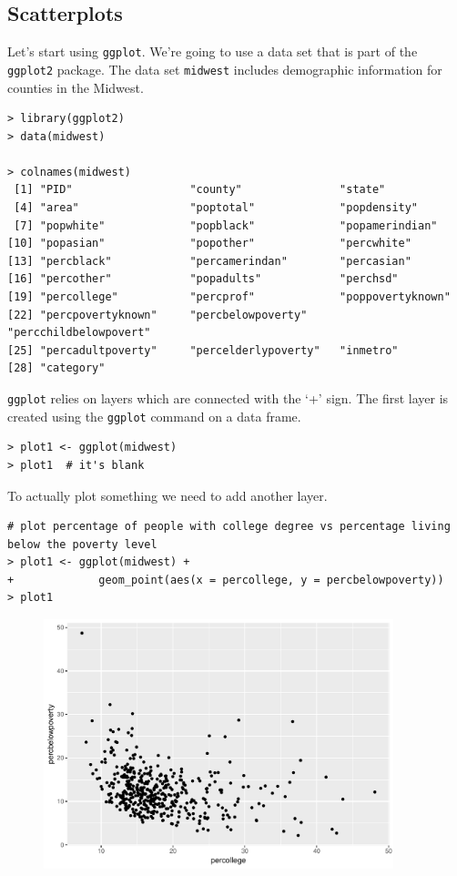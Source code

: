 \subsection{Scatterplots}

Let's start using \texttt{ggplot}. We're going to use a data set that is part of the \texttt{ggplot2} package. The data set \texttt{midwest} includes demographic information for counties in the Midwest.

\begin{lstlisting}
> library(ggplot2)
> data(midwest)

> colnames(midwest)
 [1] "PID"                  "county"               "state"               
 [4] "area"                 "poptotal"             "popdensity"          
 [7] "popwhite"             "popblack"             "popamerindian"       
[10] "popasian"             "popother"             "percwhite"           
[13] "percblack"            "percamerindan"        "percasian"           
[16] "percother"            "popadults"            "perchsd"             
[19] "percollege"           "percprof"             "poppovertyknown"     
[22] "percpovertyknown"     "percbelowpoverty"     "percchildbelowpovert"
[25] "percadultpoverty"     "percelderlypoverty"   "inmetro"             
[28] "category"   
\end{lstlisting}

\texttt{ggplot} relies on layers which are connected with the `+' sign. The first layer is created using the \texttt{ggplot} command on a data frame.

\begin{lstlisting}
> plot1 <- ggplot(midwest)
> plot1  # it's blank
\end{lstlisting}

To actually plot something we need to add another layer.

\begin{lstlisting}
# plot percentage of people with college degree vs percentage living below the poverty level
> plot1 <- ggplot(midwest) + 
+             geom_point(aes(x = percollege, y = percbelowpoverty))
> plot1
\end{lstlisting}

\begin{figure}[h]
\centering
\includegraphics[width=4in]{plots/03.pdf} 
\end{figure}

